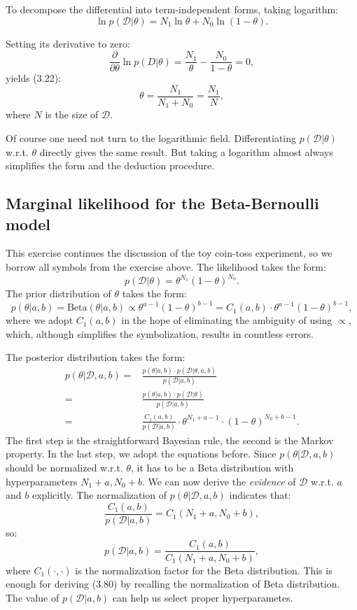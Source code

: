 \documentclass[UTF8]{ctexart}
\begin{document}
To decompose the differential into term-independent forms, taking logarithm:
$$\ln p(\mathcal{D}|\theta) = N_{1}\ln \theta + N_{0} \ln (1-\theta).$$

Setting its derivative to zero:
$$\frac{\partial}{\partial \theta} \ln p(D|\theta) = \frac{N_{1}}{\theta} -\frac{N_{0}}{1-\theta}=0,$$
yields (3.22):
$$\theta = \frac{N_{1}}{N_{1}+N_{0}}=\frac{N_{1}}{N},$$
where $N$ is the size of $\mathcal{D}$.

Of course one need not turn to the logarithmic field.
Differentiating $p(\mathcal{D}|\theta)$ w.r.t. $\theta$ directly gives the same result.
But taking a logarithm almost always simplifies the form and the deduction procedure.

\subsection{Marginal likelihood for the Beta-Bernoulli model}
This exercise continues the discussion of the toy coin-toss experiment, so we borrow all symbols from the exercise above.
The likelihood takes the form:
$$p(\mathcal{D}|\theta) = \theta^{N_{1}}(1-\theta)^{N_{0}}.$$
The prior distribution of $\theta$ takes the form:
$$p(\theta|a,b)=\text{Beta}(\theta|a,b)\propto \theta^{a-1}(1-\theta)^{b-1}=C_{1}(a,b)\cdot \theta^{a-1}(1-\theta)^{b-1},$$
where we adopt $C_{1}(a,b)$ in the hope of eliminating the ambiguity of using $\propto$, which, although simplifies the symbolization, results in countless errors.

The posterior distribution takes the form:
$$
\begin{aligned}
p(\theta|\mathcal{D},a,b) =& \frac{p(\theta|a,b)\cdot p(\mathcal{D}|\theta,a,b)}{p(\mathcal{D}|a,b)} \\
=&\frac{p(\theta|a,b)\cdot p(\mathcal{D}|\theta)}{p(\mathcal{D}|a,b)} \\
=&\frac{C_{1}(a,b)}{p(\mathcal{D}|a,b)}\cdot \theta^{N_{1}+a-1}\cdot (1-\theta)^{N_{0}+b-1}.\nonumber
\end{aligned}
$$
The first step is the straightforward Bayesian rule, the second is the Markov property.
In the last step, we adopt the equations before.
Since $p(\theta|\mathcal{D},a,b)$ should be normalized w.r.t. $\theta$, it has to be a Beta distribution with hyperparameters $N_{1}+a,N_{0}+b$.
We can now derive the \emph{evidence} of $\mathcal{D}$ w.r.t. $a$ and $b$ explicitly.
The normalization of $p(\theta|\mathcal{D},a,b)$ indicates that:
$$\frac{C_{1}(a,b)}{p(\mathcal{D}|a,b)}=C_{1}(N_{1}+a,N_{0}+b),$$
so:
$$p(\mathcal{D}|a,b)=\frac{C_{1}(a,b)}{C_{1}(N_{1}+a,N_{0}+b)},$$
where $C_{1}(\cdot,\cdot)$ is the normalization factor for the Beta distribution.
This is enough for deriving (3.80) by recalling the normalization of Beta distribution.
The value of $p(\mathcal{D}|a,b)$ can help us select proper hyperparametes.
\end{document}
